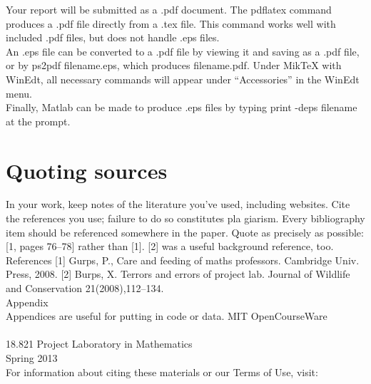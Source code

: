 \documentclass{article}
\begin{document}
Your report will be submitted as a .pdf document. The pdflatex
command produces a .pdf ﬁle directly from a .tex ﬁle. This command
works well with included .pdf ﬁles, but does not handle .eps ﬁles.\\
An .eps ﬁle can be converted to a .pdf ﬁle by viewing it and saving
as a .pdf ﬁle, or by ps2pdf filename.eps, which produces
filename.pdf. Under MikTeX with WinEdt, all necessary commands
will appear under “Accessories” in the WinEdt menu.\\
Finally, Matlab can be made to produce .eps ﬁles by typing
print -deps filename
at the prompt.\\

\section{Quoting sources}

In your work, keep notes of the literature you’ve used, including
websites. Cite the references you use; failure to do so constitutes pla­
giarism. Every bibliography item should be referenced somewhere in
the paper. Quote as precisely as possible: [1, pages 76–78] rather than
[1]. [2] was a useful background reference, too.\\
   References
[1] Gurps, P., Care and feeding of maths professors. Cambridge Univ. Press, 2008.
[2] Burps, X. Terrors and errors of project lab. Journal of Wildlife and Conserva­tion 21(2008),112–134.\\
   Appendix\\
   Appendices are useful for putting in code or data.
   \newpage
   MIT OpenCourseWare\\
  \cite{http://ocw.mit.edu}\\
   
 18.821 Project Laboratory in Mathematics\\
    Spring 2013\\
    
For information about citing these  materials or our Terms of Use, visit: \cite{http://ocw.mit.edu/lerms.} 
\end{document}
